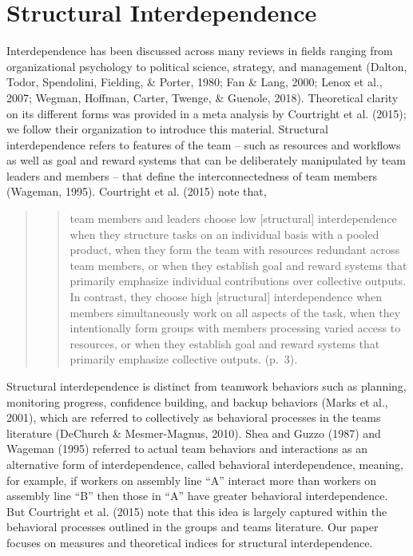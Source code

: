 \documentclass[english,,man]{apa6}
\theoremstyle{definition}
\theoremstyle{definition}
\theoremstyle{definition}
\theoremstyle{remark}
\begin{document}
\hypertarget{structural-interdependence}{%
\section{Structural Interdependence}\label{structural-interdependence}}

Interdependence has been discussed across many reviews in fields ranging
from organizational psychology to political science, strategy, and
management (Dalton, Todor, Spendolini, Fielding, \& Porter, 1980; Fan \&
Lang, 2000; Lenox et al., 2007; Wegman, Hoffman, Carter, Twenge, \&
Guenole, 2018). Theoretical clarity on its different forms was provided
in a meta analysis by Courtright et al. (2015); we follow their
organization to introduce this material. Structural interdependence
refers to features of the team -- such as resources and workflows as
well as goal and reward systems that can be deliberately manipulated by
team leaders and members -- that define the interconnectedness of team
members (Wageman, 1995). Courtright et al. (2015) note that,

\begin{quote}
\begin{quote}
team members and leaders choose low {[}structural{]} interdependence
when they structure tasks on an individual basis with a pooled product,
when they form the team with resources redundant across team members, or
when they establish goal and reward systems that primarily emphasize
individual contributions over collective outputs. In contrast, they
choose high {[}structural{]} interdependence when members simultaneously
work on all aspects of the task, when they intentionally form groups
with members processing varied access to resources, or when they
establish goal and reward systems that primarily emphasize collective
outputs. (p.~3).
\end{quote}
\end{quote}

Structural interdependence is distinct from teamwork behaviors such as
planning, monitoring progress, confidence building, and backup behaviors
(Marks et al., 2001), which are referred to collectively as behavioral
processes in the teams literature (DeChurch \& Mesmer-Magnus, 2010).
Shea and Guzzo (1987) and Wageman (1995) referred to actual team
behaviors and interactions as an alternative form of interdependence,
called behavioral interdependence, meaning, for example, if workers on
assembly line \enquote{A} interact more than workers on assembly line
\enquote{B} then those in \enquote{A} have greater behavioral
interdependence. But Courtright et al. (2015) note that this idea is
largely captured within the behavioral processes outlined in the groups
and teams literature. Our paper focuses on measures and theoretical
indices for structural interdependence.
\end{document}
